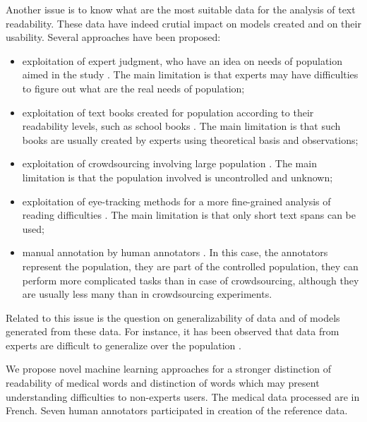 Another issue is to know what are the most suitable data for the
analysis of text readability. These data have indeed crutial impact on
models created and on their usability.  Several approaches have been
proposed:
\begin{itemize}
\item exploitation of expert judgment, who have an idea on needs of
  population aimed in the study \citep{DeClerc-NLE2014}. The main
  limitation is that experts may have difficulties to figure out what
  are the real needs of population;
\item exploitation of text books created for population according to
  their readability levels, such as school books
  \citep{Gala-ELEX2013}. The main limitation is that such books are
  usually created by experts using theoretical basis and observations;
\item exploitation of crowdsourcing involving large population
  \citep{DeClerc-NLE2014}.  The main limitation is that the
  population involved is uncontrolled and unknown;
\item exploitation of eye-tracking methods for a more fine-grained
  analysis of reading difficulties
  \citep{Yaneva-CCA2015,Grabar-ICHI2018}.  The main limitation is that
  only short text spans can be used;
\item manual annotation by human annotators
  \citep{Grabar-LREC2016t}. In this case, the annotators represent the
  population, they are part of the controlled population, they can
  perform more complicated tasks than in case of crowdsourcing,
  although they are usually less many than in crowdsourcing
  experiments.
\end{itemize}
Related to this issue is the question on generalizability of data and
of models generated from these data.  For instance, it has been
observed that data from experts are difficult to generalize over the
population \citep{DeClerc-NLE2014}.

We propose novel machine learning approaches for a stronger distinction of readability of medical words and distinction of words which may present understanding difficulties to non-experts users. The medical data processed are in French. Seven human annotators participated in creation of the reference data.